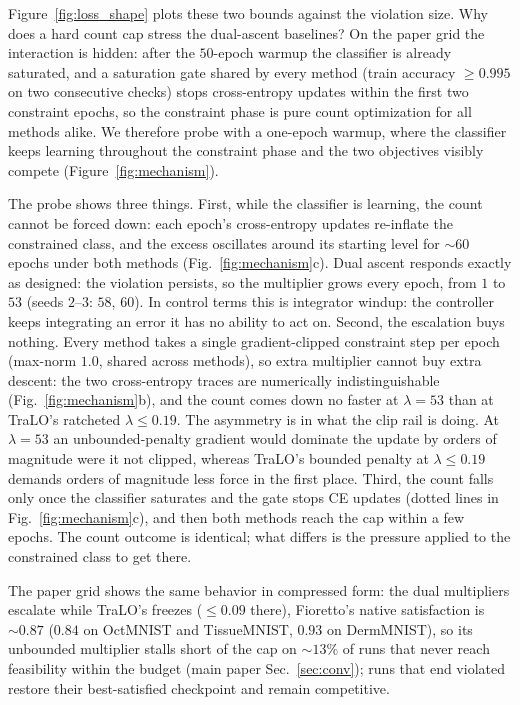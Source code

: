 \documentclass[letterpaper]{article}
\begin{document}
Figure~\ref{fig:loss_shape} plots these two bounds against the violation size. Why does a
hard count cap stress the dual-ascent baselines? On the paper grid the
interaction is hidden: after the $50$-epoch warmup the classifier is already saturated,
and a saturation gate shared by every method (train accuracy $\ge 0.995$ on two
consecutive checks) stops cross-entropy updates within the first two constraint
epochs, so the constraint phase is pure count optimization for all methods alike. We
therefore probe with a one-epoch warmup, where the classifier keeps learning
throughout the constraint phase and the two objectives visibly compete
(Figure~\ref{fig:mechanism}).

The probe shows three things. First, while the classifier is learning, the count cannot
be forced down: each epoch's cross-entropy updates re-inflate the constrained class, and
the excess oscillates around its starting level for ${\sim}60$ epochs under both
methods (Fig.~\ref{fig:mechanism}c). Dual ascent responds exactly as designed: the
violation persists, so the multiplier grows every epoch, from $1$ to $53$ (seeds
$2$--$3$: $58$, $60$). In control terms this is integrator windup: the controller keeps
integrating an error it has no ability to act on. Second, the escalation buys nothing.
Every method takes a single
gradient-clipped constraint step per epoch (max-norm $1.0$, shared across methods), so
extra multiplier cannot buy extra descent: the two cross-entropy traces are numerically
indistinguishable (Fig.~\ref{fig:mechanism}b), and the count comes down no faster at
$\lambda{=}53$ than at TraLO's ratcheted $\lambda\le 0.19$. The asymmetry is in what the
clip rail is doing. At $\lambda{=}53$ an unbounded-penalty gradient would dominate the
update by orders of magnitude were it not clipped, whereas TraLO's bounded penalty at
$\lambda\le 0.19$ demands orders of magnitude less force in the first place. Third, the
count falls only once the
classifier saturates and the gate stops CE updates (dotted lines in
Fig.~\ref{fig:mechanism}c), and then both methods reach the cap within a few
epochs. The count outcome is identical; what differs is the pressure applied to the
constrained class to get there.

The paper grid shows the same behavior in compressed form: the dual multipliers escalate
while TraLO's freezes ($\le 0.09$ there), Fioretto's native satisfaction is
${\sim}0.87$ ($0.84$ on OctMNIST and TissueMNIST, $0.93$ on DermMNIST), so its unbounded
multiplier stalls short of the cap on ${\sim}13\%$ of runs that never reach feasibility
within the budget (main paper Sec.~\ref{sec:conv}); runs that end
violated restore their best-satisfied checkpoint and remain competitive.
\end{document}
